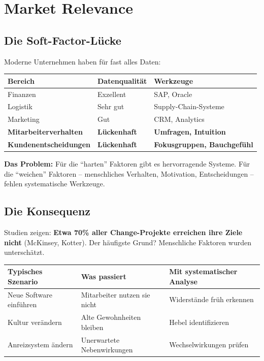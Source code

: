 \documentclass[11pt,a4paper]{article}
\begin{document}
\newpage

\section{Market Relevance}

\subsection{Die Soft-Factor-Lücke}

Moderne Unternehmen haben für fast alles Daten:

\begin{table}[h]
\centering
\begin{tabular}{lll}
\toprule
\textbf{Bereich} & \textbf{Datenqualität} & \textbf{Werkzeuge} \\
\midrule
Finanzen & Exzellent & SAP, Oracle \\
Logistik & Sehr gut & Supply-Chain-Systeme \\
Marketing & Gut & CRM, Analytics \\
\textbf{Mitarbeiterverhalten} & \textbf{Lückenhaft} & \textbf{Umfragen, Intuition} \\
\textbf{Kundenentscheidungen} & \textbf{Lückenhaft} & \textbf{Fokusgruppen, Bauchgefühl} \\
\bottomrule
\end{tabular}
\end{table}

\begin{insightbox}
\textbf{Das Problem:} Für die ``harten'' Faktoren gibt es hervorragende Systeme. Für die ``weichen'' Faktoren -- menschliches Verhalten, Motivation, Entscheidungen -- fehlen systematische Werkzeuge.
\end{insightbox}

\subsection{Die Konsequenz}

Studien zeigen: \textbf{Etwa 70\% aller Change-Projekte erreichen ihre Ziele nicht} (McKinsey, Kotter). Der häufigste Grund? Menschliche Faktoren wurden unterschätzt.

\begin{table}[h]
\centering
\begin{tabularx}{\textwidth}{lXX}
\toprule
\textbf{Typisches Szenario} & \textbf{Was passiert} & \textbf{Mit systematischer Analyse} \\
\midrule
Neue Software einführen & Mitarbeiter nutzen sie nicht & Widerstände früh erkennen \\
Kultur verändern & Alte Gewohnheiten bleiben & Hebel identifizieren \\
Anreizsystem ändern & Unerwartete Nebenwirkungen & Wechselwirkungen prüfen \\
\bottomrule
\end{tabularx}
\end{table}
\end{document}
